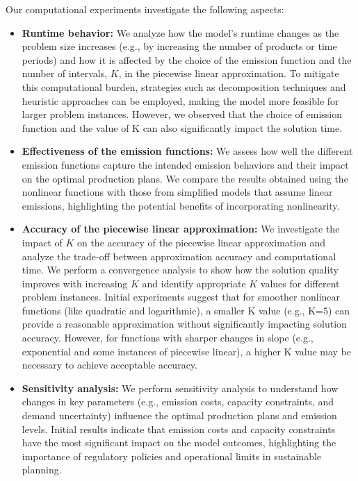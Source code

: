 \documentclass[final,3p,times,review,authoryear]{elsarticle}
\begin{document}
Our computational experiments investigate the following aspects:
\begin{itemize}
    \item \textbf{Runtime behavior:} We analyze how the model's runtime changes as the problem size increases (e.g., by increasing the number of products or time periods) and how it is affected by the choice of the emission function and the number of intervals, $K$, in the piecewise linear approximation. To mitigate this computational burden, strategies such as decomposition techniques and heuristic approaches can be employed, making the model more feasible for larger problem instances. However, we observed that the choice of emission function and the value of K can also significantly impact the solution time.
    \item \textbf{Effectiveness of the emission functions:} We assess how well the different emission functions capture the intended emission behaviors and their impact on the optimal production plans. We compare the results obtained using the nonlinear functions with those from simplified models that assume linear emissions, highlighting the potential benefits of incorporating nonlinearity.
    \item \textbf{Accuracy of the piecewise linear approximation:} We investigate the impact of $K$ on the accuracy of the piecewise linear approximation and analyze the trade-off between approximation accuracy and computational time. We perform a convergence analysis to show how the solution quality improves with increasing $K$ and identify appropriate $K$ values for different problem instances. Initial experiments suggest that for smoother nonlinear functions (like quadratic and logarithmic), a smaller K value (e.g., K=5) can provide a reasonable approximation without significantly impacting solution accuracy. However, for functions with sharper changes in slope (e.g., exponential and some instances of piecewise linear), a higher K value may be necessary to achieve acceptable accuracy.
    \item \textbf{Sensitivity analysis: } We perform sensitivity analysis to understand how changes in key parameters (e.g., emission costs, capacity constraints, and demand uncertainty) influence the optimal production plans and emission levels. Initial results indicate that emission costs and capacity constraints have the most significant impact on the model outcomes, highlighting the importance of regulatory policies and operational limits in sustainable planning.
\end{itemize}
\end{document}
